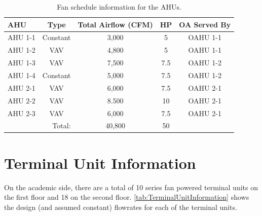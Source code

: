 \begin{table}
\centering
\caption{Fan schedule information for the AHUs.}
\label{tab:FanSched}
\begin{tabular}{l c c c c}
\toprule
AHU 	& Type	 	& Total Airflow (CFM) 	& HP 	& OA Served By\\
\midrule
AHU 1-1 & Constant  & 3,000 			  	& 5 	& OAHU 1-1 \\
AHU 1-2 & VAV 		& 4,800 				& 5 	& OAHU 1-1 \\
AHU 1-3 & VAV 		& 7,500 				& 7.5 	& OAHU 1-2 \\
AHU 1-4 & Constant 	& 5,000 				& 7.5 	& OAHU 1-2 \\
AHU 2-1 & VAV 		& 6,000 				& 7.5 	& OAHU 2-1 \\
AHU 2-2 & VAV		& 8.500					& 10 	& OAHU 2-1 \\
AHU 2-3 & VAV 		& 6,000					& 7.5	& OAHU 2-1 \\
\bottomrule
\multicolumn{2}{r}{Total:} & 40,800 & 50 &  \\
\end{tabular}
\end{table}

\section{Terminal Unit Information}

On the academic side, there are a total of 10 series fan powered terminal units on the first floor and 18 on the second floor. \tableref{} \ref{tab:TerminalUnitInformation} shows the design (and assumed constant) flowrates for each of the terminal units. 

